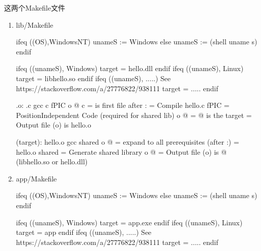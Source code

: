 \documentclass[letterpaper,12pt,english]{sphinxmanual}
\begin{document}
这两个Makefile文件
\begin{enumerate}
%
\item {} 
lib/Makefile

\begin{sphinxVerbatim}[commandchars=\\\{\}]
ifeq (\PYGZdl{}(OS),Windows\PYGZus{}NT)
    uname\PYGZus{}S := Windows
else
    uname\PYGZus{}S := \PYGZdl{}(shell uname \PYGZhy{}s)
endif

ifeq (\PYGZdl{}(uname\PYGZus{}S), Windows)
    target = hello.dll
endif
ifeq (\PYGZdl{}(uname\PYGZus{}S), Linux)
    target = libhello.so
endif
\PYGZsh{}ifeq (\PYGZdl{}(uname\PYGZus{}S), .....) \PYGZsh{}See https://stackoverflow.com/a/27776822/938111
\PYGZsh{}    target = .....
\PYGZsh{}endif

\PYGZpc{}.o: \PYGZpc{}.c
    gcc  \PYGZhy{}c \PYGZdl{}\PYGZlt{}  \PYGZhy{}fPIC  \PYGZhy{}o \PYGZdl{}@
    \PYGZsh{} \PYGZhy{}c \PYGZdl{}\PYGZlt{}  =\PYGZgt{} \PYGZdl{}\PYGZlt{} is first file after \PYGZsq{}:\PYGZsq{} =\PYGZgt{} Compile hello.c
    \PYGZsh{} \PYGZhy{}fPIC  =\PYGZgt{} Position\PYGZhy{}Independent Code (required for shared lib)
    \PYGZsh{} \PYGZhy{}o \PYGZdl{}@  =\PYGZgt{} \PYGZdl{}@ is the target =\PYGZgt{} Output file (\PYGZhy{}o) is hello.o

\PYGZdl{}(target): hello.o
    gcc  \PYGZdl{}\PYGZca{}  \PYGZhy{}shared  \PYGZhy{}o \PYGZdl{}@
    \PYGZsh{} \PYGZdl{}\PYGZca{}      =\PYGZgt{} \PYGZdl{}\PYGZca{} expand to all prerequisites (after \PYGZsq{}:\PYGZsq{}) =\PYGZgt{} hello.o
    \PYGZsh{} \PYGZhy{}shared =\PYGZgt{} Generate shared library
    \PYGZsh{} \PYGZhy{}o \PYGZdl{}@   =\PYGZgt{} Output file (\PYGZhy{}o) is \PYGZdl{}@ (libhello.so or hello.dll)
\end{sphinxVerbatim}

\item {} 
app/Makefile

\begin{sphinxVerbatim}[commandchars=\\\{\}]
ifeq (\PYGZdl{}(OS),Windows\PYGZus{}NT)
    uname\PYGZus{}S := Windows
else
    uname\PYGZus{}S := \PYGZdl{}(shell uname \PYGZhy{}s)
endif

ifeq (\PYGZdl{}(uname\PYGZus{}S), Windows)
    target = app.exe
endif
ifeq (\PYGZdl{}(uname\PYGZus{}S), Linux)
    target = app
endif
\PYGZsh{}ifeq (\PYGZdl{}(uname\PYGZus{}S), .....) \PYGZsh{}See https://stackoverflow.com/a/27776822/938111
\PYGZsh{}    target = .....
\PYGZsh{}endif


\end{sphinxVerbatim}
\end{enumerate}
\end{document}
